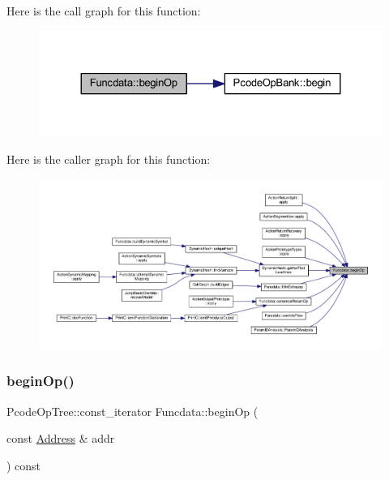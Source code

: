 Here is the call graph for this function\+:
\nopagebreak
\begin{figure}[H]
\begin{center}
\leavevmode
\includegraphics[width=324pt]{class_funcdata_a47de4c82b4a74b356153eb8e4215f639_cgraph}
\end{center}
\end{figure}
Here is the caller graph for this function\+:
\nopagebreak
\begin{figure}[H]
\begin{center}
\leavevmode
\includegraphics[width=350pt]{class_funcdata_a47de4c82b4a74b356153eb8e4215f639_icgraph}
\end{center}
\end{figure}
\mbox{\label{class_funcdata_a07dbd8a5ef4e19cd8e8c445cf8e43282}} 
\subsubsection{\texorpdfstring{beginOp()}{beginOp()}\hspace{0.1cm}{\footnotesize\ttfamily [2/2]}}
{\footnotesize\ttfamily Pcode\+Op\+Tree\+::const\+\_\+iterator Funcdata\+::begin\+Op (\begin{DoxyParamCaption}\item[{const \mbox{\hyperlink{class_address}{Address}} \&}]{addr }\end{DoxyParamCaption}) const\hspace{0.3cm}{\ttfamily [inline]}}



